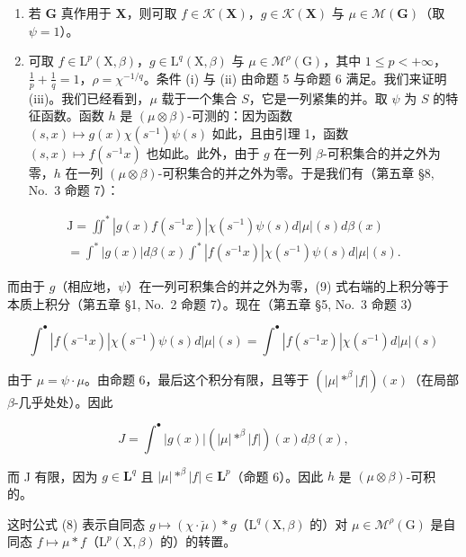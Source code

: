 \begin{enumerate}
\def\labelenumi{\arabic{enumi})}
\setcounter{enumi}{4}
\item
  若 \(\mathbf{G}\) 真作用于 \(\mathbf{X}\)，则可取 \(f \in \mathcal{K}(\mathbf{X})\)，\(g \in \mathcal{K}(\mathbf{X})\) 与 \(\mu \in \mathcal{M}(\mathbf{G})\)（取 \(\psi = 1\)）。
\item
  可取 \(f \in \mathrm{L}^p(\mathrm{X},\beta)\)，\(g \in \mathrm{L}^q(\mathrm{X},\beta)\) 与 \(\mu \in \mathcal{M}^\rho(\mathrm{G})\)，其中 \(1 \leqslant p < +\infty\)，\(\frac{1}{p} + \frac{1}{q} = 1\)，\(\rho = \chi^{-1/q}\)。条件 (i) 与 (ii) 由命题 5 与命题 6 满足。我们来证明 (iii)。我们已经看到，\(\mu\) 载于一个集合 \(S\)，它是一列紧集的并。取 \(\psi\) 为 \(S\) 的特征函数。函数 \(h\) 是 \((\mu \otimes \beta)\)-可测的：因为函数 \((s,x) \mapsto g(x)\chi(s^{-1})\psi(s)\) 如此，且由引理 1，函数 \((s,x) \mapsto f(s^{-1}x)\) 也如此。此外，由于 \(g\) 在一列 \(\beta\)-可积集合的并之外为零，\(h\) 在一列 \((\mu \otimes \beta)\)-可积集合的并之外为零。于是我们有（第五章 §8, No.~3 命题 7）：
\end{enumerate}

\[
\begin{array}{l} \mathrm{J} = \iint^ {*} | g (x) f (s ^ {- 1} x) | \chi (s ^ {- 1}) \psi (s) d | \mu | (s) d \beta (x) \\ = \int^ {*} | g (x) | d \beta (x) \int^ {*} | f (s ^ {- 1} x) | \chi (s ^ {- 1}) \psi (s) d | \mu | (s). \end{array}\tag{9}
\]

而由于 \(g\)（相应地，\(\psi\)）在一列可积集合的并之外为零，(9) 式右端的上积分等于本质上积分（第五章 §1, No.~2 命题 7）。现在（第五章 §5, No.~3 命题 3）

\[
\int^ {\bullet} | f (s ^ {- 1} x) | \chi (s ^ {- 1}) \psi (s) d | \mu | (s) = \int^ {\bullet} | f (s ^ {- 1} x) | \chi (s ^ {- 1}) d | \mu | (s)
\]

由于 \(\mu = \psi \cdot \mu\)。由命题 6，最后这个积分有限，且等于 \((|\mu| *^{\beta} |f|)(x)\)（在局部 \(\beta\)-几乎处处）。因此

\[
J = \int^ {\bullet} | g (x) | \left(| \mu | * ^ {\beta} | f |\right) (x) d \beta (x),
\]

而 J 有限，因为 \(g \in \mathbf{L}^q\) 且 \(|\mu| *^\beta |f| \in \mathbf{L}^p\)（命题 6）。因此 \(h\) 是 \((\mu \otimes \beta)\)-可积的。

这时公式 (8) 表示自同态 \(g \mapsto (\chi \cdot \breve{\mu}) * g\)（\(\mathrm{L}^q(\mathrm{X},\beta)\) 的）对 \(\mu \in \mathcal{M}^\rho(\mathrm{G})\) 是自同态 \(f \mapsto \mu * f\)（\(\mathrm{L}^p(\mathrm{X},\beta)\) 的）的转置。

